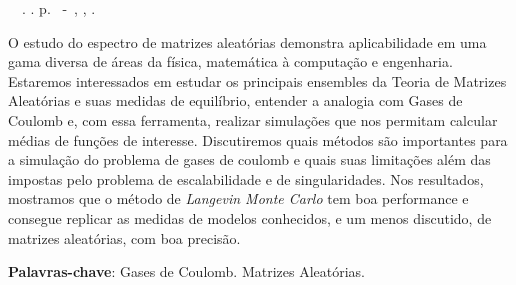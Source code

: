 \setlength{\absparsep}{18pt} %
\begin{resumo}
	\begin{flushleft} 
			\setlength{\absparsep}{0pt} %
			\SingleSpacing 
			\imprimirautorabr~~\textbf{\imprimirtituloresumo}.	\imprimirdata. \pageref{LastPage}p. 
			\imprimirtipotrabalho~-~\imprimirinstituicao, \imprimirlocal, \imprimirdata. 
 	\end{flushleft}
\OnehalfSpacing 	
		
O estudo do espectro de matrizes aleatórias demonstra aplicabilidade em uma gama diversa de áreas da física, matemática à computação e engenharia. Estaremos interessados em estudar os principais ensembles da Teoria de Matrizes Aleatórias e suas medidas de equilíbrio, entender a analogia com Gases de Coulomb e, com essa ferramenta, realizar simulações que nos permitam calcular médias de funções de interesse. Discutiremos quais métodos são importantes para a simulação do problema de gases de coulomb e quais suas limitações além das impostas pelo problema de escalabilidade e de singularidades. Nos resultados, mostramos que o método de \textit{Langevin Monte Carlo} tem boa performance e consegue replicar as medidas de modelos conhecidos, e um menos discutido, de matrizes aleatórias, com boa precisão. 

 \textbf{Palavras-chave}: Gases de Coulomb. Matrizes Aleatórias. 
\end{resumo}